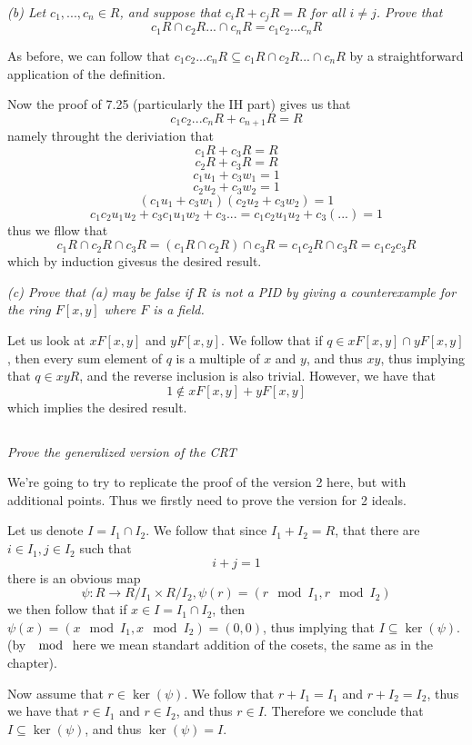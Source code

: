 \documentclass[11pt,oneside,titlepage]{book}
\begin{document}
\textit{(b) Let $c_1, ..., c_n \in R$, and suppose that $c_iR + c_jR =
R$ for all $i \neq j$. Prove that
  $$c_1 R \cap c_2 R ... \cap c_nR = c_1 c_2 ... c_n R$$
}

As before, we can follow that $c_1 c_2 ... c_n R \subseteq c_1 R \cap
c_2 R ... \cap c_nR$ by a straightforward application of the
definition.

Now the proof of 7.25 (particularly the IH part) gives us that
$$c_1 c_2 ... c_n R + c_{n + 1} R = R$$
namely throught the deriviation that
$$c_1 R + c_3 R = R$$
$$c_2 R + c_3 R = R$$
$$c_1 u_1 + c_3 w_1 = 1$$
$$c_2 u_2 + c_3 w_2 = 1$$
$$(c_1 u_1 + c_3 w_1) (c_2 u_2 + c_3 w_2) = 1$$
$$c_1 c_2 u_1 u_2 + c_3 c_1 u_1 w_2 + c_3 ... = c_1 c_2 u_1 u_2 + c_3 (...) = 1$$
thus we fllow that
$$c_1 R \cap c_2 R \cap c_3 R =
(c_1 R \cap c_2 R) \cap c_3 R = c_1 c_2 R \cap c_3 R = c_1 c_2 c_3R$$
which by induction givesus the desired result.

\textit{(c) Prove that (a) may be false if $R$ is not a PID by giving
a counterexample for the ring $F[x, y]$ where $F$ is a field.  }

Let us look at $xF[x, y]$ and $yF[x, y]$. We follow that if $q \in
xF[x, y] \cap yF[x, y]$, then every sum element of $q$ is a multiple
of $x$ and $y$, and thus $xy$, thus implying that $q \in xyR$, and the
reverse inclusion is also trivial. However, we have that
$$1 \notin xF[x, y] + yF[x, y]$$
which implies the desired result.

\subsection{}

\textit{Prove the generalized version of the CRT}

We're going to try to replicate the proof of the version 2
here, but with additional points. Thus we firstly need to
prove the version for 2 ideals.

Let us denote $I = I_1 \cap I_2$.  We follow that since $I_1 + I_2 =
R$, that there are $i \in I_1, j \in I_2$ such that
$$i + j = 1$$
there is an obvious map
$$\psi: R \to R/I_1 \times R/I_2, \psi(r) = (r \mod I_1, r \mod I_2)$$
we then follow that if $x \in I = I_1 \cap I_2$, then $\psi(x) = (x
\mod I_1, x \mod I_2) = (0, 0)$, thus implying that $I \subseteq
\ker(\psi)$.
(by $\mod$ here we mean standart addition of the cosets, the same as
in the chapter).

Now assume that $r \in \ker(\psi)$. We follow that $r + I_1 = I_1$ and
$r + I_2 = I_2$, thus we have that $r \in I_1$ and $r \in I_2$,
and thus $r \in I$. Therefore we conclude that $I \subseteq \ker(\psi)$,
and thus $\ker(\psi) = I$.
\end{document}
